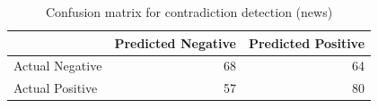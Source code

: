 \begin{table}
\caption{Confusion matrix for contradiction detection (news)}
\label{tab:confusion_matrix}
\begin{tabular}{lrr}
\toprule
 & Predicted Negative & Predicted Positive \\
\midrule
Actual Negative & 68 & 64 \\
Actual Positive & 57 & 80 \\
\bottomrule
\end{tabular}
\end{table}
